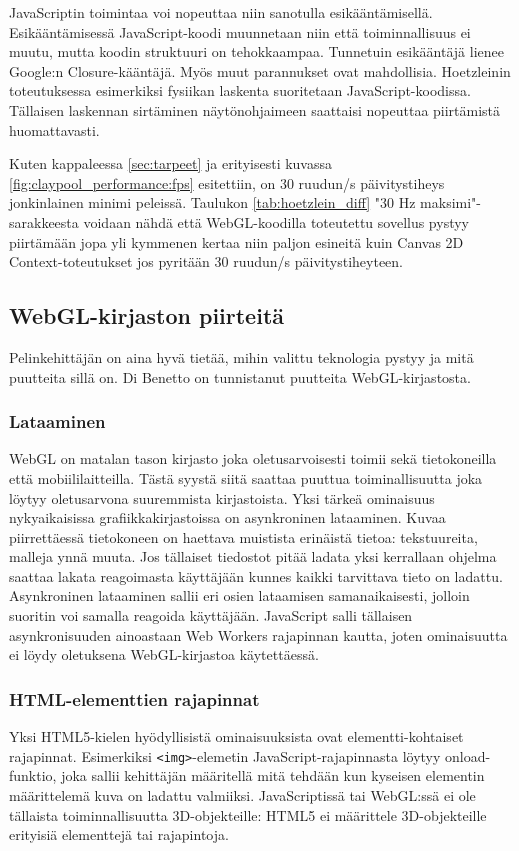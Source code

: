 JavaScriptin toimintaa voi nopeuttaa niin sanotulla esikääntämisellä. Esikääntämisessä JavaScript-koodi muunnetaan niin että toiminnallisuus ei muutu, mutta koodin struktuuri on tehokkaampaa. Tunnetuin esikääntäjä lienee Google:n Closure-kääntäjä\cite{googleclosure}. Myös muut parannukset ovat mahdollisia. Hoetzleinin\cite{hoetzlein} toteutuksessa esimerkiksi fysiikan laskenta suoritetaan JavaScript-koodissa. Tällaisen laskennan sirtäminen näytönohjaimeen saattaisi nopeuttaa piirtämistä huomattavasti.

Kuten kappaleessa \ref{sec:tarpeet} ja erityisesti kuvassa \ref{fig:claypool_performance:fps} esitettiin, on 30 ruudun/s päivitystiheys jonkinlainen minimi peleissä. Taulukon \ref{tab:hoetzlein_diff} "30 Hz maksimi"-sarakkeesta voidaan nähdä että WebGL-koodilla toteutettu sovellus pystyy piirtämään jopa yli kymmenen kertaa niin paljon esineitä kuin Canvas 2D Context-toteutukset jos pyritään 30 ruudun/s päivitystiheyteen.   

\subsection{WebGL-kirjaston piirteitä}
\label{subsec:piirteet}

Pelinkehittäjän on aina hyvä tietää, mihin valittu teknologia pystyy ja mitä puutteita sillä on. Di Benetto\cite{dibenedettoSpider} on tunnistanut puutteita WebGL-kirjastosta.

\subsubsection{Lataaminen}
WebGL on matalan tason kirjasto joka oletusarvoisesti toimii sekä tietokoneilla että mobiililaitteilla. Tästä syystä siitä saattaa puuttua toiminallisuutta joka löytyy oletusarvona suuremmista kirjastoista.
Yksi tärkeä ominaisuus nykyaikaisissa grafiikkakirjastoissa on asynkroninen lataaminen. Kuvaa piirrettäessä tietokoneen on haettava muistista erinäistä tietoa: tekstuureita, malleja ynnä muuta. Jos tällaiset tiedostot pitää ladata yksi kerrallaan ohjelma saattaa lakata reagoimasta käyttäjään kunnes kaikki tarvittava tieto on ladattu. Asynkroninen lataaminen sallii eri osien lataamisen samanaikaisesti, jolloin suoritin voi samalla reagoida käyttäjään. JavaScript salli tällaisen asynkronisuuden ainoastaan Web Workers rajapinnan kautta\cite{htmlwebworkers}, joten ominaisuutta ei löydy oletuksena WebGL-kirjastoa käytettäessä.

\subsubsection{HTML-elementtien rajapinnat}
Yksi HTML5-kielen hyödyllisistä ominaisuuksista ovat elementti-kohtaiset rajapinnat. Esimerkiksi \texttt{<img>}-elemetin JavaScript-rajapinnasta löytyy onload-funktio, joka sallii kehittäjän määritellä mitä tehdään kun kyseisen elementin määrittelemä kuva on ladattu valmiiksi. JavaScriptissä tai WebGL:ssä ei ole tällaista toiminnallisuutta 3D-objekteille: HTML5 ei määrittele 3D-objekteille erityisiä elementtejä tai rajapintoja.

